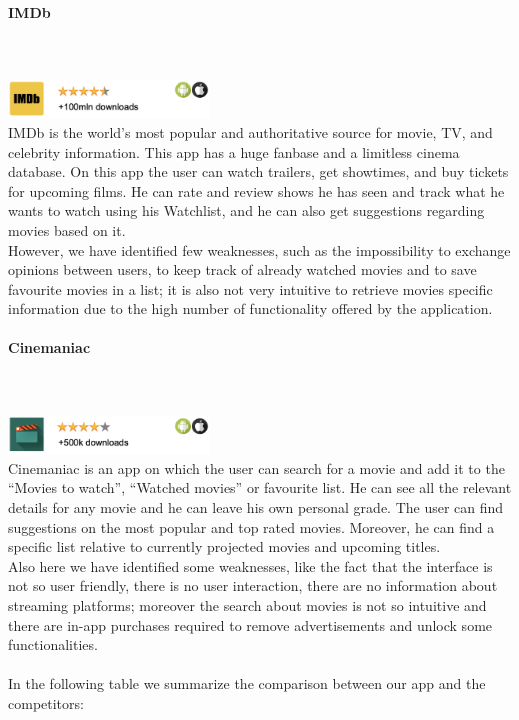 \documentclass[12pt, a4paper]{article}
\begin{document}
\paragraph{IMDb}\mbox{}\\\\
\includegraphics[width=0.4\textwidth]{Images/IMDb.png}\\
IMDb is the world's most popular and authoritative source for movie, TV, and celebrity information. This app has a
huge fanbase and a limitless cinema database.
On this app the user can watch trailers, get showtimes, and buy tickets for upcoming films. He can rate and review shows he has seen
and track what he wants to watch using his Watchlist, and he can also get suggestions regarding movies based on it.\\
However, we have identified few weaknesses, such as the impossibility to exchange opinions between users, to keep track
of already watched movies and to save favourite movies in a list; it is also not very intuitive to retrieve movies specific
information due to the high number of functionality offered by the application.

\paragraph{Cinemaniac}\mbox{}\\\\
\includegraphics[width=0.4\textwidth]{Images/Cinemaniac.png}\\
Cinemaniac is an app on which the user can search for a movie and add it to the “Movies to watch”, “Watched movies” or favourite list.
He can see all the relevant details for any movie and he can leave his own personal grade.
The user can find suggestions on the most popular and top rated movies.
Moreover, he can find a specific list relative to currently projected movies and upcoming titles.\\
Also here we have identified some weaknesses, like the fact that the interface is not so user friendly, there is no user interaction,
there are no information about streaming platforms; moreover the search about movies is not so intuitive and there are
in-app purchases required to remove advertisements and unlock some functionalities.\\\\
In the following table we summarize the comparison between our app and the competitors:
\end{document}

